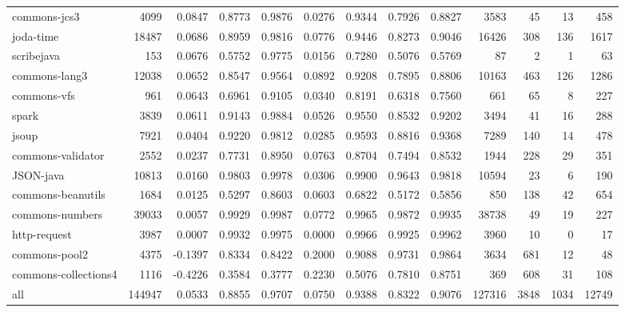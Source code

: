 \begin{table}
\begin{tabular}{lrrrrrrrrrrrr}
           commons-jcs3 &    4099 &      0.0847 &  0.8773 &     0.9876 &     0.0276 &  0.9344 &     0.7926 &   0.8827 &    3583 &    45 &    13 &    458 \\
              joda-time &   18487 &      0.0686 &  0.8959 &     0.9816 &     0.0776 &  0.9446 &     0.8273 &   0.9046 &   16426 &   308 &   136 &   1617 \\
             scribejava &     153 &      0.0676 &  0.5752 &     0.9775 &     0.0156 &  0.7280 &     0.5076 &   0.5769 &      87 &     2 &     1 &     63 \\
          commons-lang3 &   12038 &      0.0652 &  0.8547 &     0.9564 &     0.0892 &  0.9208 &     0.7895 &   0.8806 &   10163 &   463 &   126 &   1286 \\
            commons-vfs &     961 &      0.0643 &  0.6961 &     0.9105 &     0.0340 &  0.8191 &     0.6318 &   0.7560 &     661 &    65 &     8 &    227 \\
                  spark &    3839 &      0.0611 &  0.9143 &     0.9884 &     0.0526 &  0.9550 &     0.8532 &   0.9202 &    3494 &    41 &    16 &    288 \\
                  jsoup &    7921 &      0.0404 &  0.9220 &     0.9812 &     0.0285 &  0.9593 &     0.8816 &   0.9368 &    7289 &   140 &    14 &    478 \\
      commons-validator &    2552 &      0.0237 &  0.7731 &     0.8950 &     0.0763 &  0.8704 &     0.7494 &   0.8532 &    1944 &   228 &    29 &    351 \\
              JSON-java &   10813 &      0.0160 &  0.9803 &     0.9978 &     0.0306 &  0.9900 &     0.9643 &   0.9818 &   10594 &    23 &     6 &    190 \\
      commons-beanutils &    1684 &      0.0125 &  0.5297 &     0.8603 &     0.0603 &  0.6822 &     0.5172 &   0.5856 &     850 &   138 &    42 &    654 \\
        commons-numbers &   39033 &      0.0057 &  0.9929 &     0.9987 &     0.0772 &  0.9965 &     0.9872 &   0.9935 &   38738 &    49 &    19 &    227 \\
           http-request &    3987 &      0.0007 &  0.9932 &     0.9975 &     0.0000 &  0.9966 &     0.9925 &   0.9962 &    3960 &    10 &     0 &     17 \\
          commons-pool2 &    4375 &     -0.1397 &  0.8334 &     0.8422 &     0.2000 &  0.9088 &     0.9731 &   0.9864 &    3634 &   681 &    12 &     48 \\
   commons-collections4 &    1116 &     -0.4226 &  0.3584 &     0.3777 &     0.2230 &  0.5076 &     0.7810 &   0.8751 &     369 &   608 &    31 &    108 \\
                    all &  144947 &      0.0533 &  0.8855 &     0.9707 &     0.0750 &  0.9388 &     0.8322 &   0.9076 &  127316 &  3848 &  1034 &  12749 \\
\bottomrule
\end{tabular}
\end{table}

